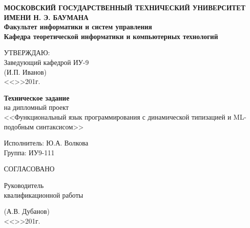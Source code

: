 \documentclass[12pt,a4paper,oneside]{extarticle}
\begin{document}
\pgfplotsset{compat=1.8}

\thispagestyle{empty}
\newpage
{
\centering


\textbf{
МОСКОВСКИЙ ГОСУДАРСТВЕННЫЙ ТЕХНИЧЕСКИЙ УНИВЕРСИТЕТ ИМЕНИ Н. Э. БАУМАНА \\
Факультет информатики и систем управления \\
Кафедра теоретической информатики и компьютерных технологий}

\vfill

\hfill\parbox{7cm} {
УТВЕРЖДАЮ:\\
Заведующий кафедрой ИУ-9 \hfill \\
\underline{\hspace{4cm}}(И.П. Иванов)\hfill \\
<<\underline{\hspace{0.5cm}}>>\underline{\hspace{3cm}}201\underline{\hspace{0.5cm}}г.\hfill \\
}

\bigskip
\bigskip
\bigskip
\bigskip
\bigskip
\bigskip
\bigskip
\bigskip

\vfill

{\large\bf Техническое задание} \\
на дипломный проект \\
<<Функциональный язык программирования с динамической типизацией и ML-подобным синтаксисом>>

\vfill

\hfill\parbox{7cm} {
Исполнитель: Ю.А. Волкова \\
Группа: ИУ9-111
}

\bigskip
\bigskip
\bigskip
\bigskip
\bigskip
\bigskip
\bigskip

\vfill

\hfill\parbox{7cm} {
СОГЛАСОВАНО
}

\vfill

Руководитель \\
квалификационной работы \\
\vfill

\hfill\parbox{7cm} {
\underline{\hspace{4cm}}(А.В. Дубанов)\hfill \medskip\\
<<\underline{\hspace{0.5cm}}>>\underline{\hspace{3cm}}201\underline{\hspace{0.5cm}}г.\hfill \\
}

\vspace{\fill}
}
\end{document}
